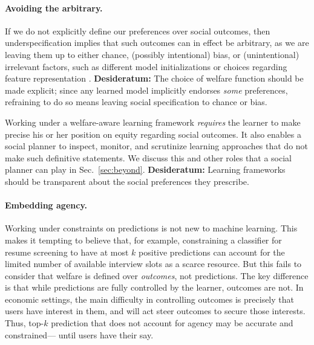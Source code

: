 {%

\paragraph{Avoiding the arbitrary.}
If we do not explicitly define our preferences over social outcomes,
then underspecification implies that such outcomes can in effect be arbitrary,
as we are leaving them up to either chance,
(possibly intentional) bias, or (unintentional) irrelevant factors,
such as 
different model initializations \cite{d2022underspecification}
or choices regarding feature representation \citep{hron2023modeling}.
\bbox
\textbf{Desideratum:}
The choice of welfare function should be made explicit;
since any learned model implicitly %
endorses \emph{some} preferences,
refraining to do so means leaving social specification to chance or bias. 
\ebox


Working under a welfare-aware learning framework \emph{requires}
the learner to make precise his or her position on equity regarding social outcomes.
It also enables a social planner to inspect, monitor, and scrutinize
learning approaches that do not make such definitive statements.
We discuss this and other roles that a social planner can play in Sec.~\ref{sec:beyond}.
\bbox
\textbf{Desideratum:}
Learning frameworks should be transparent about the social preferences they prescribe. %
\ebox



\paragraph{Embedding agency.}
Working under constraints on predictions is not new to machine learning.
This makes it tempting to believe that, for example,
constraining a classifier for resume screening to have at most $k$ positive predictions can account for the limited number of available interview slots as a scarce resource.
But this fails to consider that welfare is defined over \emph{outcomes}, not predictions.
The key difference is that while predictions are fully controlled by the learner, outcomes are not.
In economic settings, the main difficulty in controlling outcomes is precisely that users have interest in them,
and will act steer outcomes to secure those interests.
Thus, top-$k$ prediction that does not account for agency
may be accurate and constrained---%
until users have their say.
\squeeze

}
